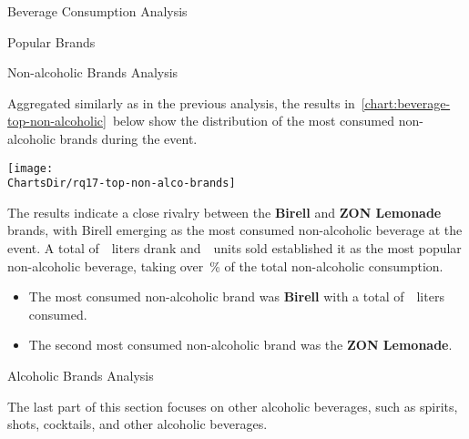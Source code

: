\begin{section}{Beverage Consumption Analysis}
\begin{subsection}{Popular Brands}
		\vspace*{\fill}\pagebreak[4] %

		\begin{subsubsection}{Non-alcoholic Brands Analysis}
			\label{subsubsec:analysis-beverage-popular-non-alcoholic}


			Aggregated similarly as in the previous analysis, the results in~\autoref{chart:beverage-top-non-alcoholic}~below show the distribution of the most consumed non-alcoholic brands during the event.

			\begin{chart}[H]
				\centering
				\texttt{[image: \\ChartsDir/rq17-top-non-alco-brands]}
				\caption{ Most Consumed Non-Alcoholic Brands}
				\label{chart:beverage-top-non-alcoholic}
				\source
			\end{chart}

			The results indicate a close rivalry between the \textbf{Birell} and \textbf{ZON Lemonade} brands, with Birell emerging as the most consumed non-alcoholic beverage at the event.
			A total of~~liters drank and~~units sold established it as the most popular non-alcoholic beverage, taking over~\% of the total non-alcoholic consumption.

			\begin{keytakeaways}
				\begin{itemize}
					\item The most consumed non-alcoholic brand was \textbf{Birell} with a total of~~liters consumed.
					\item The second most consumed non-alcoholic brand was the \textbf{ZON Lemonade}.
				\end{itemize}
			\end{keytakeaways}
		\end{subsubsection}

		\begin{subsubsection}{Alcoholic Brands Analysis}
			\label{subsubsec:analysis-beverage-popular-alcoholic}

			The last part of this section focuses on other alcoholic beverages, such as spirits, shots, cocktails, and other alcoholic beverages.


\end{subsubsection}
\end{subsection}
\end{section}
